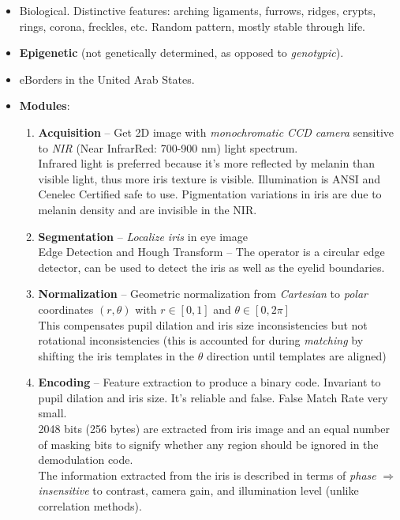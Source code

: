 \documentclass[a4paper]{article}
\begin{document}
      \begin{itemize}
        \item Biological. Distinctive features: arching ligaments, furrows, ridges, crypts, rings, corona, freckles, etc. Random pattern, mostly stable through life.
        \item \textbf{Epigenetic} (not genetically determined, as opposed to \emph{genotypic}).
        \item eBorders in the United Arab States.
        \item\textbf{Modules}:
        \begin{enumerate}
          \item \textbf{Acquisition} -- Get 2D image with \emph{monochromatic CCD camera} sensitive to \emph{NIR} (Near InfrarRed: 700-900 nm) light spectrum.\\
          Infrared light is preferred because it's more reflected by melanin than visible light, thus more iris texture is visible. Illumination is ANSI and Cenelec Certified safe to use. Pigmentation variations in iris are due to melanin density and are invisible in the NIR.
          \item \textbf{Segmentation} -- \emph{Localize iris} in eye image\\
          Edge Detection and Hough Transform -- The operator is a circular edge detector, can be used to detect the iris as well as the eyelid boundaries.
          \item \textbf{Normalization} -- Geometric normalization from \emph{Cartesian} to \emph{polar} coordinates $(r,\theta)$ with $r\in [0,1]$ and $\theta\in [0,2\pi]$\\
          This compensates pupil dilation and iris size inconsistencies but not rotational inconsistencies (this is accounted for during \emph{matching} by shifting the iris templates in the $\theta$ direction until templates are aligned)
          \item \textbf{Encoding} -- Feature extraction to produce a binary code. Invariant to pupil dilation and iris size. It's reliable and false. False Match Rate very small.\\
          2048 bits (256 bytes) are extracted from iris image and an equal number of masking bits to signify whether any region should be ignored in the demodulation code.\\
          The information extracted from the iris is described in terms of \emph{phase} $\Rightarrow$ \emph{insensitive} to contrast, camera gain, and illumination level (unlike correlation methods).\\

\end{enumerate}
\end{itemize}
\end{document}
